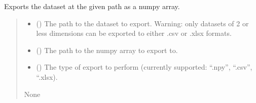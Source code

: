 \documentclass[letterpaper,10pt,english]{sphinxmanual}
\begin{document}
\begin{fulllineitems}
\begin{fulllineitems}
\begin{quote}
\begin{description}
\end{description}\end{quote}

\end{fulllineitems}


\begin{fulllineitems}
\label{\detokenize{_autosummary/HDF5_BLS.wrapper:HDF5_BLS.wrapper.Wrapper.export_dataset}}
\pysigstartsignatures
\pysiglinewithargsret
{}
{\sphinxparamcomma {}\sphinxparamcomma {}}
{}
\pysigstopsignatures
\sphinxAtStartPar
Exports the dataset at the given path as a numpy array.
\begin{quote}\begin{description}
\begin{itemize}
\item {} 
\sphinxAtStartPar
{} () \textendash{} The path to the dataset to export. Warning: only datasets of 2 or less dimensions can be exported to either .csv or .xlsx formats.

\item {} 
\sphinxAtStartPar
{} () \textendash{} The path to the numpy array to export to.

\item {} 
\sphinxAtStartPar
{} () \textendash{} The type of export to perform (currently supported: “.npy”, “.csv”, “.xlsx).

\end{itemize}

\sphinxAtStartPar
None

\end{description}\end{quote}

\end{fulllineitems}



\end{fulllineitems}
\end{document}
